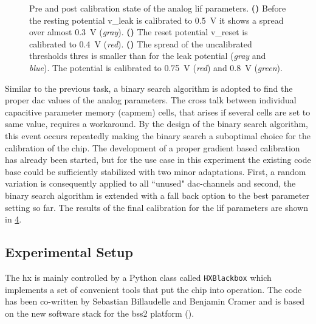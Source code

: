 \begin{figure}[htb!]
	\begin{subfigure}{0.32\textwidth}
		\caption{}
		\centering
		
		\label{hxprepostvleak}
	\end{subfigure}
	\begin{subfigure}{0.32\textwidth}
		\caption{}
		\centering
		
		\label{hxprepostvreset}
	\end{subfigure}
	\begin{subfigure}{0.32\textwidth}
		\caption{}
		\centering
		
		\label{hxprepostvthreshold}
	\end{subfigure}
	\caption[Pre and post calibration state of the analog \gls{lif} parameters.]{Pre and post calibration state of the analog \gls{lif} parameters. \textbf{()} Before the resting potential \gls{v_leak} is calibrated to \SI{0.5}{\V} it shows a spread over almost \SI{0.3}{\V} (\textit{gray}). \textbf{()} The reset potential \gls{v_reset} is calibrated to \SI{0.4}{\V} (\textit{red}). \textbf{()} The spread of the uncalibrated thresholds \gls{thres} is smaller than for the leak potential (\textit{gray} and \textit{blue}). The potential is calibrated to \SI{0.75}{\V} (\textit{red}) and \SI{0.8}{\V} (\textit{green}).}
	\label{hxprepostcalib}
\end{figure}
Similar to the previous task, a binary search algorithm is adopted to find the proper \gls{dac} values of the analog parameters. The cross talk between individual capacitive parameter memory (capmem) cells, that arises if several cells are set to same value, requires a workaround. By the design of the binary search algorithm, this event occurs repeatedly making the binary search a suboptimal choice for the calibration of the chip. The development of a proper gradient based calibration has already been started, but for the use case in this experiment the existing code base could be sufficiently stabilized with two minor adaptations. First, a random variation is consequently applied to all ``unused" \gls{dac}-channels and second, the binary search algorithm is extended with a fall back option to the best parameter setting so far. The results of the final calibration for the \gls{lif} parameters are shown in \cref{hxprepostcalib}.


\subsection{Experimental Setup}
The \gls{hx} is mainly controlled by a Python class called \texttt{HXBlackbox} which implements a set of convenient tools that put the chip into operation. The code has been co-written by Sebastian Billaudelle and Benjamin Cramer and is based on the new software stack for the \gls{bss2} platform (\citealp{mueller2020bss2ll}). 

